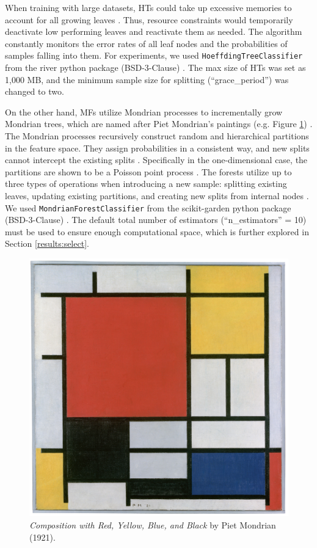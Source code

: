 When training with large datasets, HTs could take up excessive memories to account for all growing leaves \citep{domingos_mining_2000, lavanya_handwritten_2017}. Thus, resource constraints would temporarily deactivate low performing leaves and reactivate them as needed. The algorithm constantly monitors the error rates of all leaf nodes and the probabilities of samples falling into them. 
For experiments, we used \texttt{HoeffdingTreeClassifier} from the river python package (BSD-3-Clause) \citep{montiel_river_2020}. The max size of HTs was set as 1,000 MB, and the minimum sample size for splitting (``grace\_period'') was changed to two.

On the other hand, MFs utilize Mondrian processes to incrementally grow Mondrian trees, which are named after Piet Mondrian's paintings (e.g. Figure \ref{fig:mondrian_paint}) \citep{lakshminarayanan_mondrian_2014, roy_mondrian_2009, mondrian_dutch_1921}. The Mondrian processes recursively construct random and hierarchical partitions in the feature space. They assign probabilities in a consistent way, and new splits cannot intercept the existing splits \citep{lakshminarayanan_mondrian_2014}. Specifically in the one-dimensional case, the partitions are shown to be a Poisson point process \citep{roy_mondrian_2009}. The forests utilize up to three types of operations when introducing a new sample: splitting existing leaves, updating existing partitions, and creating new splits from internal nodes \citep{lakshminarayanan_mondrian_2014}.
We used \texttt{MondrianForestClassifier} from the scikit-garden python package (BSD-3-Clause) \citep{kumar_scikit-gardenscikit-garden_2017}. The default total number of estimators (``n\_estimators'' = 10) must be used to ensure enough computational space, which is further explored in Section \ref{results:select}.

\begin{figure}[!htb]
\centering
\includegraphics[width=0.3\columnwidth]{mondrian_paint.jpeg}
  \caption{\textit{Composition with Red, Yellow, Blue, and Black} by Piet Mondrian (1921).
  }
\label{fig:mondrian_paint}
\end{figure}

